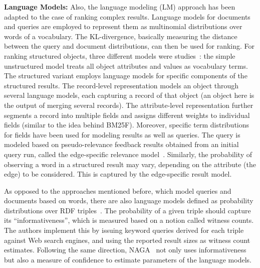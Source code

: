 \textbf{Language Models:} Also, the language modeling (LM) approach has been adapted to the case of ranking complex results. Language models for documents and queries are employed to represent them as multinomial distributions over words of a vocabulary. The KL-divergence, basically measuring the distance between the query and document distributions, can then be used for ranking. For ranking structured objects, three different models were studies~\cite{DBLP:conf/www/NieMSWM07}: the simple unstructured model treats all object attributes and values as vocabulary terms. The structured variant employs language models for specific components of the structured results. The record-level representation models an object through several language models, each capturing a record of that object (an object here is the output of merging several records). The attribute-level representation further segments a record into multiple fields and assigns different weights to individual fields (similar to the idea behind BM25F). 
Moreover, specific term distributions for fields have been used for modeling results as well as queries. The query is modeled based on pseudo-relevance feedback results obtained from an initial query run, called the edge-specific relevance model~\cite{DBLP:conf/cikm/BicerTN11}. Similarly, the probability of observing a word in a structured result may vary, depending on the attribute (the edge) to be considered. This is captured by the edge-specific result model. 
%

As opposed to the approaches mentioned before, which model queries and documents based on words, there are also language models defined as probability distributions over RDF triples~\cite{DBLP:journals/debu/ElbassuoniRSW10}. The probability of a given triple should capture its ``informativeness'', which is measured based on a notion called witness counts. The authors implement this by issuing keyword queries derived for each triple against Web search engines, and using the reported result sizes as witness count estimates. Following the same direction, NAGA~\cite{DBLP:conf/icde/KasneciSIRW08} not only uses informativeness but also a measure of confidence to estimate parameters of the language models. 

